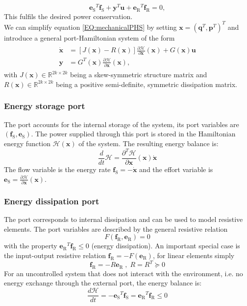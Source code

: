 \documentclass[a4paper,twoside, openright,12pt]{report}
\newcommand{\f}[1]{\boldsymbol{#1}}
\newcommand{\g}[1]{\text{#1}}
\begin{document}
\begin{equation}
{\f{e}_\g{S}}^T\f{f}_\g{S} + {\f{y}}^T\f{u} + {\f{e}_\g{R}}^T\f{f}_\g{R} = 0,
\end{equation}
This fulfils the desired power conservation.\\
We can simplify equation \ref{EQ:mechanicalPHS} by setting $\f{x} = (\f{q}^T,\f{p}^T)^T$ and introduce a general port-Hamiltonian system of the form
\begin{eqnarray}\label{EQ:generalPHS}
\begin{aligned}
\dot{\f{x}} &= [J(\f{x})-R(\f{x})]\frac{\partial \mathcal{H}}{\partial \f{x}}(\f{x}) + G(\f{x})\f{u}\\
\f{y} &= G^T(\f{x})\frac{\partial \mathcal{H}}{\partial \f{x}}(\f{x}),
\end{aligned}
\end{eqnarray}
with $J(\f{x}) \in \mathbb{R}^{2k \times 2k}$ being a skew-symmetric structure matrix and $R(\f{x})  \in  \mathbb{R}^{2k \times 2k}$ being a positive semi-definite, symmetric dissipation matrix.

\subsubsection{Energy storage port}
The port accounts for the internal storage of the system, its port variables are $ (\f{f}_\g{S},\f{e}_\g{S}) $. The power supplied through this port is stored in the Hamiltonian energy function $\mathcal{H}(\f{x})$ of the system. The resulting energy balance is:
\begin{equation}\label{EQ:storageport}
	\frac{d}{dt}\mathcal{H} = \frac{\partial^T \mathcal{H}}{\partial \f{x}}(\f{x}) \dot{\f{x}}
\end{equation}
The flow variable is the energy rate $ \f{f}_\g{S} = -\dot{\f{x}} $ and the effort variable is $ \f{e}_\g{S} = \frac{\partial \mathcal{H}}{\partial \f{x}}(\f{x}) $.

\subsubsection{Energy dissipation port}
The port corresponds to internal dissipation and can be used to model resistive elements. The port variables are described by the general resistive relation
\begin{equation}
	F(\f{f}_\g{R},\f{e}_\g{R})=0
\end{equation}
with the property  $ {\f{e}_\g{R}}^T  \f{f}_\g{R} \leq 0 $ (energy dissipation). An important special case is the input-output resistive relation $\f{f}_\g{R} = -F(\f{e}_\g{R})$, for linear elements simply
\begin{equation}
\f{f}_\g{R} = -R\f{e}_\g{R} \; , \; R=R^T \succeq 0
\end{equation}
For an uncontrolled system that does not interact with the environment, i.e. no energy exchange through the  external port, the energy balance is:
\begin{equation}
	\frac{d\mathcal{H}}{dt} = -{\f{e}_\g{S}}^T \f{f}_\g{S} = {\f{e}_\g{R}}^T \f{f}_\g{R} \leq 0
\end{equation}
\end{document}
